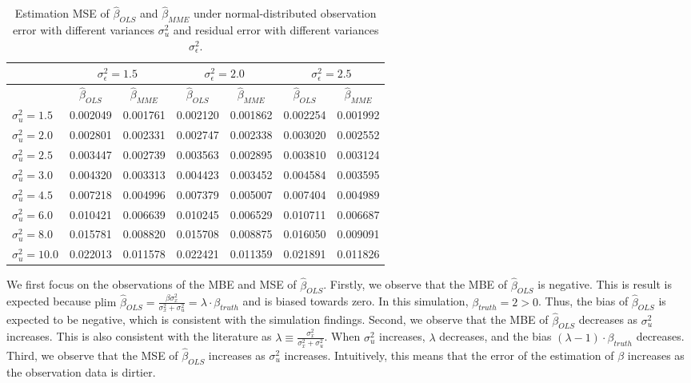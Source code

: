 \documentclass{article}
\begin{document}
\begin{table}[ht]
    \centering
    \caption{Estimation MSE of $\hat{\beta}_{OLS}$ and $\hat{\beta}_{MME}$ under normal-distributed observation error with different variances $\sigma^2_u$ and residual error with different variances $\sigma^2_\epsilon$.}
    \label{Tab:MSE_normal}
    \begin{tabular}[t]{lcccccc}
        \hline
        &\multicolumn{2}{c}{$\sigma^2_\epsilon=1.5$}&\multicolumn{2}{c}{$\sigma^2_\epsilon=2.0$}&\multicolumn{2}{c}{$\sigma^2_\epsilon=2.5$}\\
        \hline
        &$\hat{\beta}_{OLS}$&$\hat{\beta}_{MME}$&$\hat{\beta}_{OLS}$&$\hat{\beta}_{MME}$&$\hat{\beta}_{OLS}$&$\hat{\beta}_{MME}$\\
        \hline
        $\sigma^2_u = 1.5$&0.002049&0.001761&0.002120&0.001862&0.002254&0.001992\\
        $\sigma^2_u = 2.0$&0.002801&0.002331&0.002747&0.002338&0.003020&0.002552\\
        $\sigma^2_u = 2.5$&0.003447&0.002739&0.003563&0.002895&0.003810&0.003124\\
        $\sigma^2_u = 3.0$&0.004320&0.003313&0.004423&0.003452&0.004584&0.003595\\
        $\sigma^2_u = 4.5$&0.007218&0.004996&0.007379&0.005007&0.007404&0.004989\\
        $\sigma^2_u = 6.0$&0.010421&0.006639&0.010245&0.006529&0.010711&0.006687\\
        $\sigma^2_u = 8.0$&0.015781&0.008820&0.015708&0.008875&0.016050&0.009091\\
        $\sigma^2_u = 10.0$&0.022013&0.011578&0.022421&0.011359&0.021891&0.011826\\
        \hline
    \end{tabular}
\end{table}

We first focus on the observations of the MBE and MSE of $\hat{\beta}_{OLS}$.
Firstly, we observe that the MBE of $\hat{\beta}_{OLS}$ is negative.
This is result is expected because $\textrm{plim } \hat{\beta}_{OLS} = \frac{\beta \sigma^2_x}{\sigma^2_x + \sigma^2_u} = \lambda \cdot \beta_{truth}$ and is biased towards zero.
In this simulation, $\beta_{truth} = 2 > 0$.
Thus, the bias of $\hat{\beta}_{OLS}$ is expected to be negative, which is consistent with the simulation findings.
Second, we observe that the MBE of $\hat{\beta}_{OLS}$ decreases as $\sigma^2_u$ increases.
This is also consistent with the literature as $\lambda \equiv \frac{\sigma_x^2}{\sigma_x^2 + \sigma_u^2}$.
When $\sigma^2_u$ increases, $\lambda$ decreases, and the bias $(\lambda-1) \cdot \beta_{truth}$ decreases.
Third, we observe that the MSE of $\hat{\beta}_{OLS}$ increases as $\sigma^2_u$ increases. Intuitively, this means that the error of the estimation of $\beta$ increases as the observation data is dirtier. 
\end{document}
